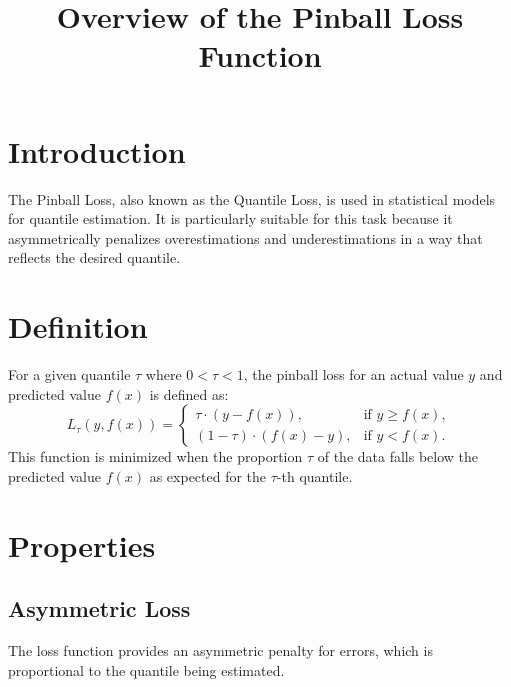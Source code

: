\documentclass{article}
\begin{document}
\title{Overview of the Pinball Loss Function}
\author{}
\date{}
\maketitle

\section{Introduction}
The Pinball Loss, also known as the Quantile Loss, is used in statistical models for quantile estimation. It is particularly suitable for this task because it asymmetrically penalizes overestimations and underestimations in a way that reflects the desired quantile.

\section{Definition}
For a given quantile \( \tau \) where \( 0 < \tau < 1 \), the pinball loss for an actual value \( y \) and predicted value \( f(x) \) is defined as:
\[
L_{\tau}(y, f(x)) = 
\begin{cases} 
\tau \cdot (y - f(x)), & \text{if } y \geq f(x),\\
(1 - \tau) \cdot (f(x) - y), & \text{if } y < f(x).
\end{cases}
\]
This function is minimized when the proportion \( \tau \) of the data falls below the predicted value \( f(x) \) as expected for the \( \tau \)-th quantile.

\section{Properties}
\subsection{Asymmetric Loss}
The loss function provides an asymmetric penalty for errors, which is proportional to the quantile being estimated.
\end{document}
